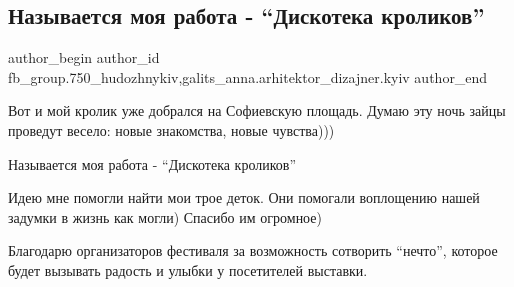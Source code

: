  
 
 
 
 

\subsection{Называется моя работа - \enquote{Дискотека кроликов}}
\label{sec:03_04_2018.fb.fb_group.750_hudozhnykiv.5.moja_rabota_diskoteka_krolikov}
 
\ifcmt
 author_begin
   author_id fb_group.750_hudozhnykiv,galits_anna.arhitektor_dizajner.kyiv
 author_end
\fi

Вот и мой кролик уже добрался на Софиевскую площадь. Думаю эту ночь зайцы
проведут весело: новые знакомства, новые чувства)))

Называется моя работа - \enquote{Дискотека кроликов}

Идею мне помогли найти мои трое деток. Они помогали воплощению нашей задумки в
жизнь как могли) Спасибо им огромное)

Благодарю организаторов фестиваля за возможность сотворить \enquote{нечто}, которое
будет вызывать радость и улыбки у посетителей выставки.

